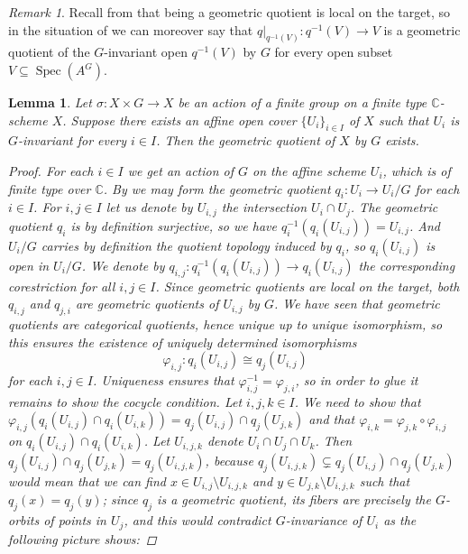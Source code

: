 \documentclass[12pt,a4paper]{amsart}
\theoremstyle{plain}
\newtheorem{lm}[thm]{Lemma}
\theoremstyle{definition}
\theoremstyle{remark}
\newtheorem{rem}[thm]{Remark}
\begin{document}
\begin{rem}\label{rem:loct2}
  Recall from  that being a geometric quotient is local on the target, so in the situation of  we can moreover say that $q|_{q^{-1}(V)} \colon q^{-1}(V) \to V$ is a geometric quotient of the $G$-invariant open $q^{-1}(V)$ by $G$ for every open subset $V \subseteq \operatorname{Spec}(A^{G})$.
\end{rem}

\begin{lm}\label{lm:affinecover}
  Let $\sigma \colon X \times G \to X$ be an action of a finite group on a finite type $\mathbb{C}$-scheme $X$.
  Suppose there exists an affine open cover $\{ U_{i} \}_{i \in I}$ of $X$ such that $U_{i}$ is $G$-invariant for every $i \in I$.
  Then the geometric quotient of $X$ by $G$ exists.

  \begin{proof}
    For each $i \in I$ we get an action of $G$ on the affine scheme $U_{i}$, which is of finite type over $\mathbb{C}$.
    By  we may form the geometric quotient $q_{i} \colon U_{i} \to U_{i}/G$ for each $i \in I$.
    For $i, j \in I$ let us denote by $U_{i,j}$ the intersection $U_{i} \cap U_{j}$.
    The geometric quotient $q_{i}$ is by definition surjective, so we have $q_{i}^{-1}(q_{i}(U_{i,j})) = U_{i,j}$.
    And $U_{i}/G$ carries by definition the quotient topology induced by $q_{i}$, so $q_{i}(U_{i,j})$ is open in $U_{i}/G$.
    We denote by $q_{i,j} \colon q_{i}^{-1}(q_{i}(U_{i,j})) \to q_{i}(U_{i,j})$ the corresponding corestriction for all $i, j \in I$.
    Since geometric quotients are local on the target, both $q_{i,j}$ and $q_{j,i}$ are geometric quotients of $U_{i,j}$ by $G$.
    We have seen that geometric quotients are categorical quotients, hence unique up to unique isomorphism, so this ensures the existence of uniquely determined isomorphisms
    \[ \varphi_{i,j} \colon q_{i}(U_{i,j}) \cong q_{j}(U_{i,j}) \]
    for each $i, j \in I$.
    Uniqueness ensures that $\varphi_{i,j}^{-1} = \varphi_{j,i}$, so in order to glue it remains to show the cocycle condition.
    Let $i, j, k \in I$.
    We need to show that $\varphi_{i,j}(q_{i}(U_{i,j})\cap q_{i}(U_{i,k})) = q_{j}(U_{i,j}) \cap q_{j}(U_{j,k})$ and that $\varphi_{i,k} = \varphi_{j,k} \circ \varphi_{i,j}$ on $q_{i}(U_{i,j}) \cap q_{i}(U_{i,k})$.
    Let $U_{i,j,k}$ denote $U_{i} \cap U_{j} \cap U_{k}$.
    Then $q_{j}(U_{i,j}) \cap q_{j}(U_{j,k}) = q_{j}(U_{i,j,k})$, because $q_{j}(U_{i,j,k}) \subsetneq q_{j}(U_{i,j}) \cap q_{j}(U_{j,k})$ would mean that we can find $x \in U_{i,j} \setminus U_{i,j,k}$ and $y \in U_{j,k} \setminus U_{i,j,k}$ such that $q_{j}(x) = q_{j}(y)$; since $q_{j}$ is a geometric quotient, its fibers are precisely the $G$-orbits of points in $U_{j}$, and this would contradict $G$-invariance of $U_{i}$ as the following picture shows:


\end{proof}
\end{lm}
\end{document}
